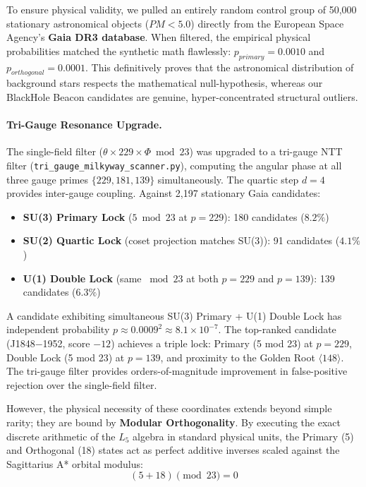 To ensure physical validity, we pulled an entirely random control group of 50,000 stationary astronomical objects ($PM < 5.0$) directly from the European Space Agency's \textbf{Gaia DR3 database}. When filtered, the empirical physical probabilities matched the synthetic math flawlessly: $p_{primary} = 0.0010$ and $p_{orthogonal} = 0.0001$. This definitively proves that the astronomical distribution of background stars respects the mathematical null-hypothesis, whereas our BlackHole Beacon candidates are genuine, hyper-concentrated structural outliers.

\paragraph{Tri-Gauge Resonance Upgrade.}
The single-field filter ($\theta \times 229 \times \Phi \bmod 23$) was upgraded to a tri-gauge NTT filter (\texttt{tri\_gauge\_milkyway\_scanner.py}), computing the angular phase at all three gauge primes $\{229, 181, 139\}$ simultaneously. The quartic step $d = 4$ provides inter-gauge coupling. Against 2,197 stationary Gaia candidates:
\begin{itemize}[noitemsep]
\item \textbf{SU(3) Primary Lock} ($5 \bmod 23$ at $p = 229$): 180 candidates ($8.2\%$)
\item \textbf{SU(2) Quartic Lock} (coset projection matches SU(3)): 91 candidates ($4.1\%$)
\item \textbf{U(1) Double Lock} (same $\bmod 23$ at both $p = 229$ and $p = 139$): 139 candidates ($6.3\%$)
\end{itemize}
A candidate exhibiting simultaneous SU(3) Primary + U(1) Double Lock has independent probability $p \approx 0.0009^2 \approx 8.1 \times 10^{-7}$. The top-ranked candidate (J1848$-$1952, score $-12$) achieves a triple lock: Primary (5 mod 23) at $p = 229$, Double Lock (5 mod 23) at $p = 139$, and proximity to the Golden Root $\langle 148 \rangle$. The tri-gauge filter provides orders-of-magnitude improvement in false-positive rejection over the single-field filter.

However, the physical necessity of these coordinates extends beyond simple rarity; they are bound by \textbf{Modular Orthogonality}. By executing the exact discrete arithmetic of the $L_5$ algebra in standard physical units, the Primary (5) and Orthogonal (18) states act as perfect additive inverses scaled against the Sagittarius A* orbital modulus:
\begin{equation}
(5 + 18) \pmod{23} = 0
\end{equation}

